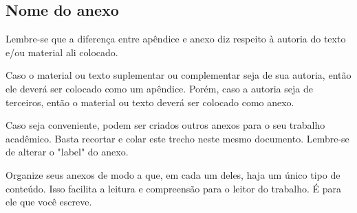 
\begin{anexosenv}
\partanexos

\chapter{Nome do anexo}     %
\label{chap:anexoA}

Lembre-se que a diferença entre apêndice e anexo diz respeito à autoria do texto e/ou material ali colocado.

Caso o material ou texto suplementar ou complementar seja de sua autoria, então ele deverá ser colocado como um apêndice. Porém, caso a autoria seja de terceiros, então o material ou texto deverá ser colocado como anexo.

Caso seja conveniente, podem ser criados outros anexos para o seu trabalho acadêmico. Basta recortar e colar este trecho neste mesmo documento. Lembre-se de alterar o "label"{} do anexo.

Organize seus anexos de modo a que, em cada um deles, haja um único tipo de conteúdo. Isso facilita a leitura e compreensão para o leitor do trabalho. É para ele que você escreve.

\end{anexosenv}
